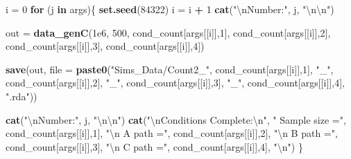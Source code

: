 \documentclass[]{DissertateCUNY}
\newenvironment{Shaded}{\begin{snugshade}}{\end{snugshade}}
\newcommand{\CharTok}[1]{\textcolor[rgb]{0.31,0.60,0.02}{#1}}
\newcommand{\ControlFlowTok}[1]{\textcolor[rgb]{0.13,0.29,0.53}{\textbf{#1}}}
\newcommand{\DataTypeTok}[1]{\textcolor[rgb]{0.13,0.29,0.53}{#1}}
\newcommand{\DecValTok}[1]{\textcolor[rgb]{0.00,0.00,0.81}{#1}}
\newcommand{\FloatTok}[1]{\textcolor[rgb]{0.00,0.00,0.81}{#1}}
\newcommand{\KeywordTok}[1]{\textcolor[rgb]{0.13,0.29,0.53}{\textbf{#1}}}
\newcommand{\NormalTok}[1]{#1}
\newcommand{\OperatorTok}[1]{\textcolor[rgb]{0.81,0.36,0.00}{\textbf{#1}}}
\newcommand{\StringTok}[1]{\textcolor[rgb]{0.31,0.60,0.02}{#1}}
\begin{document}
\begin{Shaded}
\begin{Highlighting}[]
\NormalTok{i =}\StringTok{ }\DecValTok{0}
\ControlFlowTok{for}\NormalTok{ (j }\ControlFlowTok{in}\NormalTok{ args)\{}
  \KeywordTok{set.seed}\NormalTok{(}\DecValTok{84322}\NormalTok{)}
\NormalTok{  i =}\StringTok{ }\NormalTok{i }\OperatorTok{+}\StringTok{ }\DecValTok{1}
  \KeywordTok{cat}\NormalTok{(}\StringTok{"}\CharTok{\textbackslash{}n}\StringTok{Number:"}\NormalTok{, j, }\StringTok{"}\CharTok{\textbackslash{}n\textbackslash{}n}\StringTok{"}\NormalTok{)}
  
\NormalTok{  out =}\StringTok{ }\KeywordTok{data_genC}\NormalTok{(}\FloatTok{1e6}\NormalTok{, }\DecValTok{500}\NormalTok{, }
\NormalTok{                  cond_count[args[[i]],}\DecValTok{1}\NormalTok{], }
\NormalTok{                  cond_count[args[[i]],}\DecValTok{2}\NormalTok{], }
\NormalTok{                  cond_count[args[[i]],}\DecValTok{3}\NormalTok{], }
\NormalTok{                  cond_count[args[[i]],}\DecValTok{4}\NormalTok{])}
  
  \KeywordTok{save}\NormalTok{(out, }\DataTypeTok{file =} \KeywordTok{paste0}\NormalTok{(}\StringTok{"Sims_Data/Count2_"}\NormalTok{, }
\NormalTok{                          cond_count[args[[i]],}\DecValTok{1}\NormalTok{], }\StringTok{"_"}\NormalTok{,}
\NormalTok{                          cond_count[args[[i]],}\DecValTok{2}\NormalTok{], }\StringTok{"_"}\NormalTok{,}
\NormalTok{                          cond_count[args[[i]],}\DecValTok{3}\NormalTok{], }\StringTok{"_"}\NormalTok{,}
\NormalTok{                          cond_count[args[[i]],}\DecValTok{4}\NormalTok{], }\StringTok{".rda"}\NormalTok{))}
  
  \KeywordTok{cat}\NormalTok{(}\StringTok{"}\CharTok{\textbackslash{}n}\StringTok{Number:"}\NormalTok{, j, }\StringTok{"}\CharTok{\textbackslash{}n\textbackslash{}n}\StringTok{"}\NormalTok{)}
  \KeywordTok{cat}\NormalTok{(}\StringTok{"}\CharTok{\textbackslash{}n}\StringTok{Conditions Complete:}\CharTok{\textbackslash{}n}\StringTok{"}\NormalTok{,}
      \StringTok{" Sample size ="}\NormalTok{, cond_count[args[[i]],}\DecValTok{1}\NormalTok{], }
      \StringTok{"}\CharTok{\textbackslash{}n}\StringTok{  A path      ="}\NormalTok{, cond_count[args[[i]],}\DecValTok{2}\NormalTok{], }
      \StringTok{"}\CharTok{\textbackslash{}n}\StringTok{  B path      ="}\NormalTok{, cond_count[args[[i]],}\DecValTok{3}\NormalTok{], }
      \StringTok{"}\CharTok{\textbackslash{}n}\StringTok{  C path      ="}\NormalTok{, cond_count[args[[i]],}\DecValTok{4}\NormalTok{], }\StringTok{"}\CharTok{\textbackslash{}n}\StringTok{"}\NormalTok{)}
\NormalTok{\}}
\end{Highlighting}
\end{Shaded}
\end{document}
